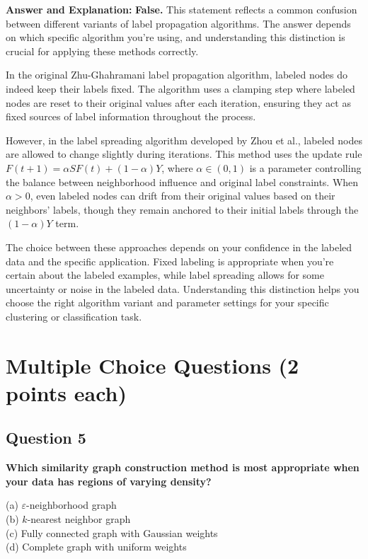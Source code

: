 \documentclass[11pt]{article}
\newenvironment{answer}{\color{answercolor}\begin{framed}\textbf{Answer and Explanation:}}{\end{framed}}
\begin{document}
\begin{answer}
\textbf{False.} This statement reflects a common confusion between different variants of label propagation algorithms. The answer depends on which specific algorithm you're using, and understanding this distinction is crucial for applying these methods correctly.

In the original Zhu-Ghahramani label propagation algorithm, labeled nodes do indeed keep their labels fixed. The algorithm uses a clamping step where labeled nodes are reset to their original values after each iteration, ensuring they act as fixed sources of label information throughout the process.

However, in the label spreading algorithm developed by Zhou et al., labeled nodes are allowed to change slightly during iterations. This method uses the update rule $F(t+1) = \alpha S F(t) + (1-\alpha) Y$, where $\alpha \in (0,1)$ is a parameter controlling the balance between neighborhood influence and original label constraints. When $\alpha > 0$, even labeled nodes can drift from their original values based on their neighbors' labels, though they remain anchored to their initial labels through the $(1-\alpha) Y$ term.

The choice between these approaches depends on your confidence in the labeled data and the specific application. Fixed labeling is appropriate when you're certain about the labeled examples, while label spreading allows for some uncertainty or noise in the labeled data. Understanding this distinction helps you choose the right algorithm variant and parameter settings for your specific clustering or classification task.
\end{answer}

\section{Multiple Choice Questions (2 points each)}

\subsection{Question 5}
\textbf{Which similarity graph construction method is most appropriate when your data has regions of varying density?}

(a) $\varepsilon$-neighborhood graph \\
(b) $k$-nearest neighbor graph \\
(c) Fully connected graph with Gaussian weights \\
(d) Complete graph with uniform weights
\end{document}
